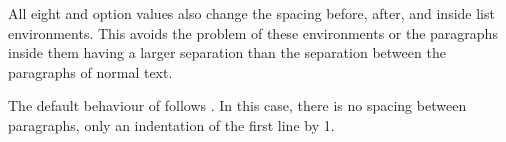 All eight  and  option values
also change the spacing before, after, and inside list environments. This
avoids the problem of these environments or the paragraphs inside them having
a larger separation than the separation between the paragraphs of normal text.
%

The default behaviour of {\KOMAScript} follows
. In this case, there is no spacing between
paragraphs, only an indentation of the first line by 1.%
%
\EndIndexGroup
%
\fi %
%
\EndIndexGroup

